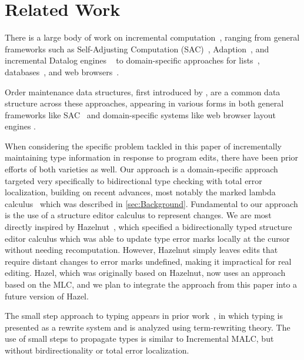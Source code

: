 
\section{Related Work}%
\label{sec:Related Work}

There is a large body of work on incremental computation~\cite{IC-Survey, IC-bib}, ranging from general frameworks such as Self-Adjusting Computation (SAC)~\cite{SAC}, Adaption~\cite{Adapton,AdaptonName}, and incremental Datalog engines ~\cite{SOUFFLE} to domain-specific approaches for lists~\cite{ICC}, databases~\cite{DDF}, and web browsers~\cite{tali-garseil}.

Order maintenance data structures, first introduced by \cite{OM}, are a common data structure across these approaches, appearing in various forms in both general frameworks like SAC~\cite{DBLP:conf/popl/AcarBH02} and domain-specific systems like web browser layout engines \cite{ST}.

When considering the specific problem tackled in this paper of incrementally maintaining type information in response to program edits, there have been prior efforts of both varieties as well. Our approach is a domain-specific approach targeted very specifically to bidirectional type checking with total error localization, building on recent advances, most notably the marked lambda calculus~\cite{DBLP:journals/pacmpl/ZhaoMDBPO24} which was described in \autoref{sec:Background}. Fundamental to our approach is the use of a structure editor calculus to represent changes. We are most directly inspired by Hazelnut~\cite{omar2017b}, which specified a bidirectionally typed structure editor calculus which was able to update type error marks locally at the cursor without needing recomputation. However, Hazelnut simply leaves edits that require distant changes to error marks undefined, making it impractical for real editing. Hazel, which was originally based on Hazelnut, now uses an approach based on the MLC, and we plan to integrate the approach from this paper into a future version of Hazel.

The small step approach to typing appears in prior work~\cite{DBLP:conf/rta/StumpKO11,DBLP:conf/esop/KuanMF07}, in which typing is presented as a rewrite system and is analyzed using term-rewriting theory. The use of small steps to propagate types is similar to Incremental MALC, but without birdirectionality or total error localization. 

